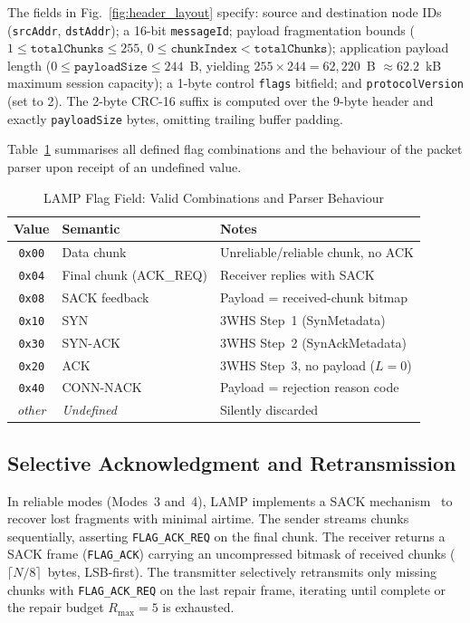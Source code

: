 \documentclass[journal]{IEEEtran}
\begin{document}
The fields in Fig.~\ref{fig:header_layout} specify: source and destination node IDs (\texttt{srcAddr}, \texttt{dstAddr}); a 16-bit \texttt{messageId}; payload fragmentation bounds ($1 \le \texttt{totalChunks} \le 255$, $0 \le \texttt{chunkIndex} < \texttt{totalChunks}$); application payload length ($0 \le \texttt{payloadSize} \le 244$~B, yielding $255 \times 244 = 62,220$~B $\approx 62.2$~kB maximum session capacity); a 1-byte control \texttt{flags} bitfield; and \texttt{protocolVersion} (set to 2). The 2-byte CRC-16 suffix is computed over the 9-byte header and exactly \texttt{payloadSize} bytes, omitting trailing buffer padding.

Table~\ref{tab:flag_combinations} summarises all defined flag combinations and the behaviour of the packet parser upon receipt of an undefined value.

\begin{table}[htpb]
\centering
\caption{LAMP Flag Field: Valid Combinations and Parser Behaviour}
\label{tab:flag_combinations}
\renewcommand{\arraystretch}{1.0}
\scriptsize
\begin{tabularx}{\columnwidth}{|c|l|>{\raggedright\arraybackslash}X|}
\hline
\textbf{Value} & \textbf{Semantic} & \textbf{Notes} \\ \hline
\texttt{0x00} & Data chunk & Unreliable/reliable chunk, no ACK \\ \hline
\texttt{0x04} & Final chunk (ACK\_REQ) & Receiver replies with SACK \\ \hline
\texttt{0x08} & SACK feedback & Payload = received-chunk bitmap \\ \hline
\texttt{0x10} & SYN & 3WHS Step~1 (SynMetadata) \\ \hline
\texttt{0x30} & SYN-ACK & 3WHS Step~2 (SynAckMetadata) \\ \hline
\texttt{0x20} & ACK & 3WHS Step~3, no payload ($L=0$) \\ \hline
\texttt{0x40} & CONN-NACK & Payload = rejection reason code \\ \hline
\textit{other} & \textit{Undefined} & Silently discarded \\ \hline
\end{tabularx}
\end{table}

\subsection{Selective Acknowledgment and Retransmission}
\label{sec:sack}
In reliable modes (Modes~3 and~4), \ac{LAMP} implements a \ac{SACK} mechanism~\cite{rfc2018, lora-arq-sar} to recover lost fragments with minimal airtime. The sender streams chunks sequentially, asserting \texttt{FLAG\_ACK\_REQ} on the final chunk. The receiver returns a \ac{SACK} frame (\texttt{FLAG\_ACK}) carrying an uncompressed bitmask of received chunks ($\lceil N/8 \rceil$~bytes, LSB-first). The transmitter selectively retransmits only missing chunks with \texttt{FLAG\_ACK\_REQ} on the last repair frame, iterating until complete or the repair budget $R_{\mathrm{max}} = 5$ is exhausted.
\end{document}
